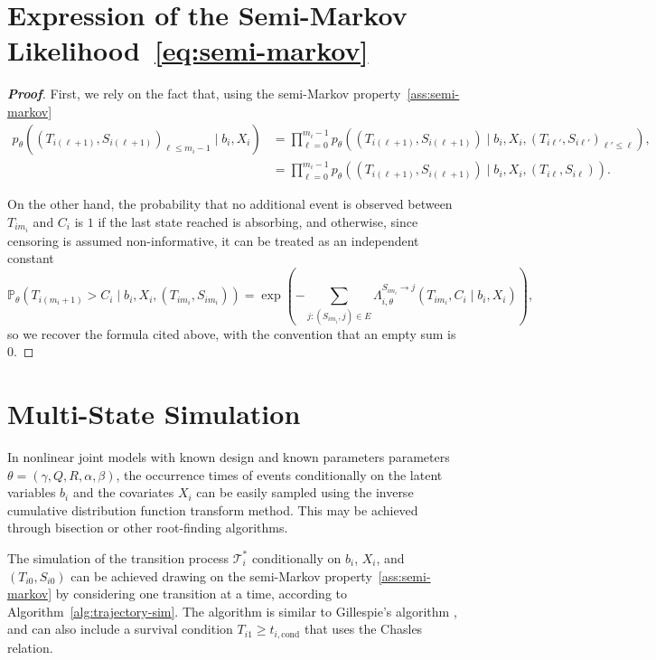 \documentclass{sn-jnl}
\begin{document}
\section{Expression of the Semi-Markov Likelihood~\ref{eq:semi-markov}} \label{sec:proof-semi-markov}

\begin{proof}[\textbf{Proof}]
First, we rely on the fact that, using the semi-Markov property~\ref{ass:semi-markov}
\begin{align*}
    p_\theta\left( (T_{i(\ell+1)}, S_{i(\ell+1)})_{\ell \leq m_i - 1} \mid b_i, X_i \right) &= \prod_{\ell=0}^{m_i - 1} p_\theta\left( (T_{i(\ell+1)}, S_{i(\ell+1)}) \mid b_i, X_i, (T_{i\ell'}, S_{i\ell'})_{\ell' \leq \ell} \right), \\
    &= \prod_{\ell=0}^{m_i - 1} p_\theta\left( (T_{i(\ell+1)}, S_{i(\ell+1)}) \mid b_i, X_i, (T_{i\ell}, S_{i\ell}) \right).
\end{align*}

On the other hand, the probability that no additional event is observed between $T_{im_i}$ and $C_i$ is $1$ if the last state reached is absorbing, and otherwise, since censoring is assumed non-informative, it can be treated as an independent constant
\[
    \mathbb{P}_{\theta}\left( T_{i (m_i+1)} > C_i \mid b_i, X_i, (T_{im_i}, S_{im_i}) \right) = \exp\left(-\sum_{j : (S_{im_i}, j) \in E} \Lambda_{i, \theta}^{S_{im_i} \to j}(T_{im_i}, C_i \mid b_i, X_i) \right),
\]
so we recover the formula cited above, with the convention that an empty sum is $0$.
\end{proof}

\section{Multi-State Simulation}

In nonlinear joint models with known design and known parameters
parameters $\theta = (\gamma, Q, R, \alpha, \beta)$, the occurrence times of events conditionally on the latent variables $b_i$ and the covariates $X_i$ can be easily sampled using the inverse cumulative distribution function transform method. This may be achieved through bisection or other root-finding algorithms.

The simulation of the transition process $\mathcal{T}_i^*$ conditionally on $b_i$, $X_i$, and $(T_{i0}, S_{i0})$ can be achieved drawing on the semi-Markov property~\ref{ass:semi-markov} by considering one transition at a time, according to Algorithm~\ref{alg:trajectory-sim}. The algorithm is similar to Gillespie's algorithm \citep{gillespie2007stochastic}, and can also include a survival condition $T_{i1} \geq t_{i, \mathrm{cond}}$ that uses the Chasles relation. 
\end{document}
